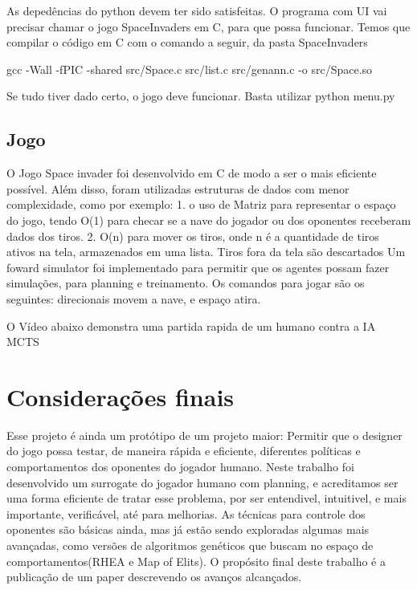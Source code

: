 \documentclass[]{book}
\begin{document}
As depedências do python devem ter sido satisfeitas. O programa com UI
vai precisar chamar o jogo SpaceInvaders em C, para que possa funcionar.
Temos que compilar o código em C com o comando a seguir, da pasta
SpaceInvaders

gcc -Wall -fPIC -shared src/Space.c src/list.c src/genann.c -o
src/Space.so

Se tudo tiver dado certo, o jogo deve funcionar. Basta utilizar python
menu.py

\section{Jogo}\label{jogo}

O Jogo Space invader foi desenvolvido em C de modo a ser o mais
eficiente possível. Além disso, foram utilizadas estruturas de dados com
menor complexidade, como por exemplo: 1. o uso de Matriz para
representar o espaço do jogo, tendo O(1) para checar se a nave do
jogador ou dos oponentes receberam dados dos tiros. 2. O(n) para mover
os tiros, onde n é a quantidade de tiros ativos na tela, armazenados em
uma lista. Tiros fora da tela são descartados Um foward simulator foi
implementado para permitir que os agentes possam fazer simulações, para
planning e treinamento. Os comandos para jogar são os seguintes:
direcionais movem a nave, e espaço atira.

O Vídeo abaixo demonstra uma partida rapida de um humano contra a IA
MCTS

\chapter{Considerações finais}\label{considerauxe7uxf5es-finais}

Esse projeto é ainda um protótipo de um projeto maior: Permitir que o
designer do jogo possa testar, de maneira rápida e eficiente, diferentes
políticas e comportamentos dos oponentes do jogador humano. Neste
trabalho foi desenvolvido um surrogate do jogador humano com planning, e
acreditamos ser uma forma eficiente de tratar esse problema, por ser
entendivel, intuitivel, e mais importante, verificável, até para
melhorias. As técnicas para controle dos oponentes são básicas ainda,
mas já estão sendo exploradas algumas mais avançadas, como versões de
algoritmos genéticos que buscam no espaço de comportamentos(RHEA e Map
of Elits). O propósito final deste trabalho é a publicação de um paper
descrevendo os avanços alcançados.


\end{document}
